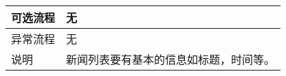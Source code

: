 \begin{table}[htbp]
\begin{tabular}{|l|l|l|l|}
        \hline
        可选流程                          & \multicolumn{3}{l|}{无 }                                                                                                                                                         \\
        \hline
        异常流程                          & \multicolumn{3}{l|}{无}                                                                                                                                                          \\
        \hline
        说明                              & \multicolumn{3}{l|}{新闻列表要有基本的信息如标题，时间等。 }                                                                                                                     \\
        \hline
    \end{tabular}
\end{table}

